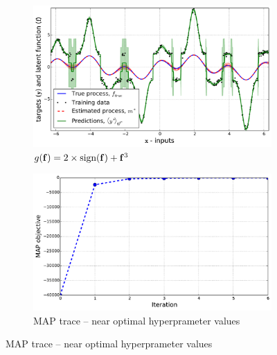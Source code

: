 \documentclass{article} %
\begin{document}
\begin{figure}[htb]
    \begin{subfigure}[b]{0.5\linewidth}
        \includegraphics[width=\linewidth]{fig/signdemo}
        \caption{$g\!\left({{\mathbf{f}}}\right) = 2\times\text{sign}\!\left({\mathbf{f}}\right)
            + \mathbf{f}^3$}
        \label{sub:sign}
    \end{subfigure}
    \begin{subfigure}[b]{0.5\linewidth}
        \includegraphics[width=\linewidth]{fig/trace_end}
        \caption{MAP trace -- near optimal hyperprameter values}
        \label{sub:mape}
        \vspace{1.5mm}
    \end{subfigure}


\end{figure}
\end{document}
